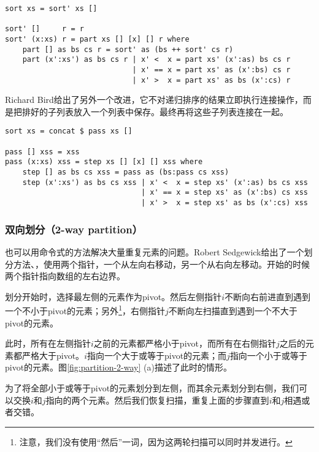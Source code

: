 \documentclass{ctexart}
\begin{document}
\lstset{language=Haskell}
\begin{lstlisting}[style=Haskell]
sort xs = sort' xs []

sort' []     r = r
sort' (x:xs) r = part xs [] [x] [] r where
    part [] as bs cs r = sort' as (bs ++ sort' cs r)
    part (x':xs') as bs cs r | x' <  x = part xs' (x':as) bs cs r
                             | x' == x = part xs' as (x':bs) cs r
                             | x' >  x = part xs' as bs (x':cs) r
\end{lstlisting}

Richard Bird给出了另外一个改进\cite{fp-pearls}，它不对递归排序的结果立即执行连接操作，而是把排好的子列表放入一个列表中保存。最终再将这些子列表连接在一起。

\lstset{language=Haskell}
\begin{lstlisting}[style=Haskell]
sort xs = concat $ pass xs []

pass [] xss = xss
pass (x:xs) xss = step xs [] [x] [] xss where
    step [] as bs cs xss = pass as (bs:pass cs xss)
    step (x':xs') as bs cs xss | x' <  x = step xs' (x':as) bs cs xss
                               | x' == x = step xs' as (x':bs) cs xss
                               | x' >  x = step xs' as bs (x':cs) xss
\end{lstlisting} %

\subsubsection{双向划分（2-way partition）}

也可以用命令式的方法解决大量重复元素的问题。Robert Sedgewick给出了一个划分方法\cite{qsort-impl}、\cite{Bentley}，使用两个指针，一个从左向右移动，另一个从右向左移动。开始的时候两个指针指向数组的左右边界。

划分开始时，选择最左侧的元素作为pivot。然后左侧指针$i$不断向右前进直到遇到一个不小于pivot的元素；另外\footnote{注意，我们没有使用“然后”一词，因为这两轮扫描可以同时并发进行。}，右侧指针$j$不断向左扫描直到遇到一个不大于pivot的元素。

此时，所有在左侧指针$i$之前的元素都严格小于pivot，而所有在右侧指针$j$之后的元素都严格大于pivot。$i$指向一个大于或等于pivot的元素；而$j$指向一个小于或等于pivot的元素。图\ref{fig:partition-2-way} (a)描述了此时的情形。

为了将全部小于或等于pivot的元素划分到左侧，而其余元素划分到右侧，我们可以交换$i$和$j$指向的两个元素。然后我们恢复扫描，重复上面的步骤直到$i$和$j$相遇或者交错。
\end{document}
